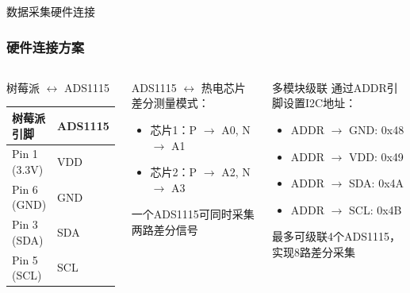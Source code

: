 \documentclass[aspectratio=169,11pt]{ctexbeamer}
\begin{document}
\begin{frame}[fragile]{数据采集硬件连接}
\frametitle{硬件连接方案}
\begin{columns}
\begin{block}{树莓派 $\leftrightarrow$ ADS1115}
\begin{tabular}{ll}
\toprule
树莓派引脚 & ADS1115 \\
\midrule
Pin 1 (3.3V) & VDD \\
Pin 6 (GND) & GND \\
Pin 3 (SDA) & SDA \\
Pin 5 (SCL) & SCL \\
\bottomrule
\end{tabular}
\end{block}

\begin{block}{ADS1115 $\leftrightarrow$ 热电芯片}
差分测量模式：
\begin{itemize}
    \item 芯片1：P $\rightarrow$ A0, N $\rightarrow$ A1
    \item 芯片2：P $\rightarrow$ A2, N $\rightarrow$ A3
\end{itemize}
一个ADS1115可同时采集两路差分信号
\end{block}

\begin{block}{多模块级联}
通过ADDR引脚设置I2C地址：
\begin{itemize}
    \item ADDR $\rightarrow$ GND: 0x48
    \item ADDR $\rightarrow$ VDD: 0x49
    \item ADDR $\rightarrow$ SDA: 0x4A
    \item ADDR $\rightarrow$ SCL: 0x4B
\end{itemize}
最多可级联4个ADS1115，实现8路差分采集
\end{block}
\end{columns}
\end{frame}
\end{document}
